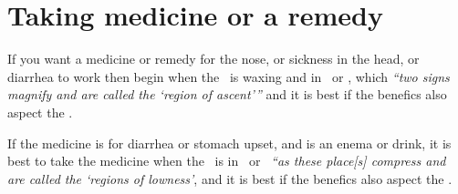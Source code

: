 \section{Taking medicine or a remedy}
	If you want a medicine or remedy for the nose, or sickness in the head, or diarrhea to work then begin when the \Moon\, is waxing and in \Aries\, or \Taurus, which \textsl{``two signs magnify and are called the `region of ascent'''} and it is best if the benefics also aspect the \Moon.
	
	If the medicine is for diarrhea or stomach upset, and is an enema or drink, it is best to take the medicine when the \Moon\, is in \Libra\, or \Scorpio\, \textsl{``as these place[s] compress and are called the `regions of lowness'}, and it is best if the benefics also aspect the \Moon.
	